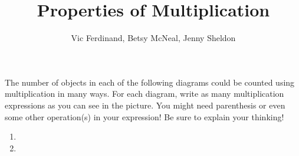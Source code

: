 \documentclass{ximera}
\title{Properties of Multiplication}
\author{Vic Ferdinand, Betsy McNeal, Jenny Sheldon}
\begin{document}
\begin{abstract} \end{abstract}
\maketitle



\begin{problem}

 The number of objects in each of the following diagrams could be counted using multiplication in many ways.  For each diagram, write as many multiplication expressions as you can see in the picture.  You might need parenthesis or even some other operation(s) in your expression!  Be sure to explain your thinking!
\begin{enumerate}
    \setlength\itemsep{1cm}
    \item \leavevmode\vadjust{\vspace{-\baselineskip}}
    \item \leavevmode\vadjust{\vspace{-\baselineskip}}
\end{enumerate}
\end{problem}
\end{document}
